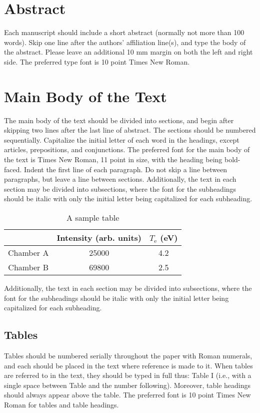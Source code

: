 \documentclass[a4paper,twocolumn,fleqn]{article}
\begin{document}
\section{Abstract}
Each manuscript should include a short abstract
(normally not more than 100 words).
%
Skip one line after the authors' affiliation line(s),
and type the body of the abstract.
%
Please leave an additional 10 mm margin on both the left and right side.
The preferred type font is 10 point Times New Roman.

\section{Main Body of the Text}
The main body of the text should be divided into sections,
and begin after skipping two lines after the last line of abstract.
The sections should be numbered sequentially.
%
Capitalize the initial letter of each word in the headings, except articles,
prepositions, and conjunctions.
%
The preferred font for the main body of the text is Times New Roman,
11 point in size, with the heading being bold-faced.
%
Indent the first line of each paragraph.
Do not skip a line between paragraphs, but leave a line between sections.
%
Additionally, the text in each section may be divided into subsections,
where the font for the subheadings should be italic
with only the initial letter being capitalized for each subheading.
%

\begin{table}
  \caption{
    \label{tb:sample_table} A sample table
  }
  \begin{tabular}{c c c}
    \hline
    & Intensity (arb. units) & $T_\mathrm{e}$ (eV) \\
    \hline
    Chamber A &       25000 &          4.2\\
    Chamber B &       69800 &          2.5\\
    \hline
  \end{tabular}
\end{table}

Additionally, the text in each section may be divided into subsections,
where the font for the subheadings should be italic
with only the initial letter being capitalized for each subheading.

\subsection{Tables}
Tables should be numbered serially throughout the paper with Roman numerals,
and each should be placed in the text where reference is made to it.
When tables are referred to in the text, they should be typed in full thus:
Table I (i.e., with a single space between Table and the number following).
 Moreover, table headings should always appear above the table.
 The preferred font is 10 point Times New Roman for tables and table headings.
\end{document}
